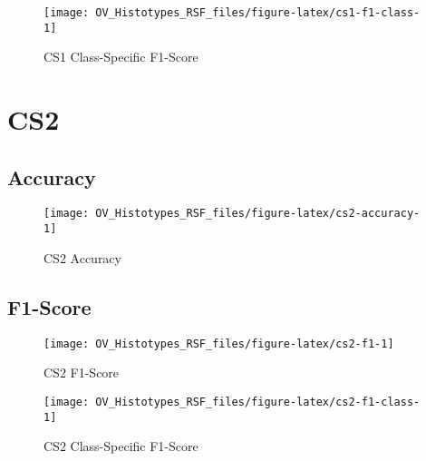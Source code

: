 \documentclass[
]{report}
\begin{document}
\begin{figure}[H]

{\centering \texttt{[image: OV\_Histotypes\_RSF\_files/figure-latex/cs1-f1-class-1]} 

}

\caption{CS1 Class-Specific F1-Score}\label{fig:cs1-f1-class}
\end{figure}

\hypertarget{cs2}{%
\section{CS2}\label{cs2}}

\hypertarget{accuracy-1}{%
\subsection{Accuracy}\label{accuracy-1}}

\begin{figure}[H]

{\centering \texttt{[image: OV\_Histotypes\_RSF\_files/figure-latex/cs2-accuracy-1]} 

}

\caption{CS2 Accuracy}\label{fig:cs2-accuracy}
\end{figure}

\hypertarget{f1-score-1}{%
\subsection{F1-Score}\label{f1-score-1}}

\begin{figure}[H]

{\centering \texttt{[image: OV\_Histotypes\_RSF\_files/figure-latex/cs2-f1-1]} 

}

\caption{CS2 F1-Score}\label{fig:cs2-f1}
\end{figure}

\begin{figure}[H]

{\centering \texttt{[image: OV\_Histotypes\_RSF\_files/figure-latex/cs2-f1-class-1]} 

}

\caption{CS2 Class-Specific F1-Score}\label{fig:cs2-f1-class}
\end{figure}

  
\end{document}
